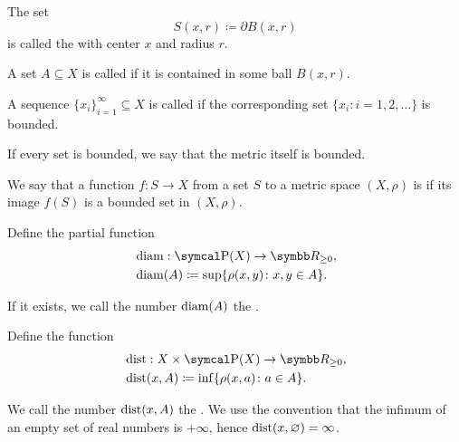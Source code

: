 \begin{definition}
\begin{defenum}
     The set
    \begin{equation*}
      S(x, r) \coloneqq \partial{B(x, r)}
    \end{equation*}
    is called the  with center \( x \) and radius \( r \).

     A set \( A \subseteq X \) is called  if it is contained in some ball \( B(x, r) \).

     A sequence \( \{ x_i \}_{i=1}^\infty \subseteq X \) is called  if the corresponding set \( \{ x_i \colon i = 1, 2, \ldots \} \) is bounded.

     If every set is bounded, we say that the metric itself is bounded.

     We say that a function \( f: S \to X \) from a set \( S \) to a metric space \( (X, \rho) \) is  if its image \( f(S) \) is a bounded set in \( (X, \rho) \).

     Define the partial function
    \begin{align*}
      &\Diam: \Power(X) \to \BR_{\geq 0}, \\
      &\Diam(A) \coloneqq \sup \{ \rho(x, y) \colon x, y \in A \}.
    \end{align*}

    If it exists, we call the number \( \operatorname{diam}(A) \) the .

     Define the function
    \begin{align*}
      &\Dist: X \times \Power(X) \to \BR_{\geq 0}, \\
      &\Dist(x, A) \coloneqq \inf \{ \rho(x, a) \colon a \in A \}.
    \end{align*}

    We call the number \( \operatorname{dist}(x, A) \) the . We use the convention that the infimum of an empty set of real numbers is \( +\infty \), hence \( \operatorname{dist}(x, \varnothing) = \infty \).
  \end{defenum}
\end{definition}

